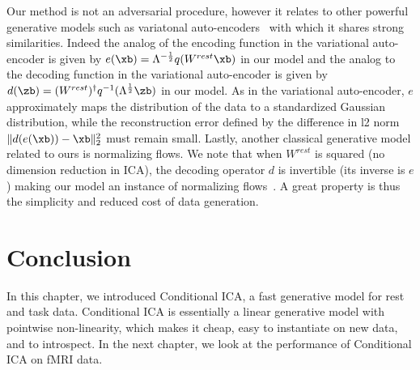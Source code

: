 Our method is not an adversarial procedure, however it relates to other
powerful generative models such as variatonal
auto-encoders~\cite{kingma2013auto} with which it shares strong similarities.
Indeed the analog of the encoding function in the variational auto-encoder is
given by $e(\xb) = \Lambda^{-\frac12}q(W^{rest} \xb)$ in our model and the analog to the decoding
function in the variational auto-encoder is given by $d(\zb) =
(W^{rest})^{\dagger}q^{-1}(\Lambda^{\frac12}\zb)$ in our model. As in the variational auto-encoder, $e$ approximately maps the distribution of the data to a standardized Gaussian distribution,
while the reconstruction error defined by the difference in l2 norm
$\|d(e(\xb)) - \xb\|^2_2$ must remain small.
Lastly, another classical generative model related to ours is normalizing
flows.  We note that when $W^{rest}$ is squared (no dimension reduction in ICA), the decoding operator $d$ is invertible (its inverse is $e$) making our
model an instance of normalizing flows~\cite{rezende2015variational}. 
%
A great property is thus the simplicity and reduced cost of data generation.

\section{Conclusion}
In this chapter, we introduced Conditional ICA, a fast generative model for rest
and task data. Conditional ICA is essentially a linear generative model with
pointwise non-linearity, which makes it cheap, easy to instantiate on new data,
and to introspect.
In the next chapter, we look at the performance of Conditional ICA on fMRI data.

